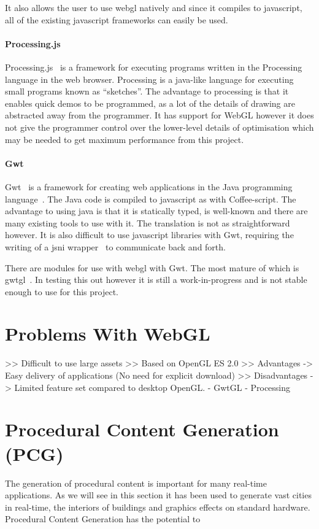 It also allows the user to use webgl natively and since it compiles to javascript, all of the existing javascript frameworks can easily be used.

\paragraph{Processing.js}
Processing.js~\cite{web:processingjs} is a framework for executing programs written in the Processing~\cite{web:processing} language in the web browser.
Processing is a java-like language for executing small programs known as ``sketches''.
The advantage to processing is that it enables quick demos to be programmed, as a lot of the details of drawing are abstracted away from the programmer.
It has support for WebGL however it does not give the programmer control over the lower-level details of optimisation which may be needed to get maximum performance from this project.

\paragraph{Gwt}
Gwt~\cite{web:gwt} is a framework for creating web applications in the Java programming language~\cite{web:java}.
The Java code is compiled to javascript as with Coffee-script.
The advantage to using java is that it is statically typed, is well-known and there are many existing tools to use with it.
The translation is not as straightforward however.
It is also difficult to use javascript libraries with Gwt, requiring the writing of a jsni wrapper~\cite{web:jsni} to communicate back and forth.

There are modules for use with webgl with Gwt.
The most mature of which is gwtgl~\cite{web:gwtgl}.
In testing this out however it is still a work-in-progress and is not stable enough to use for this project.


\section{Problems With WebGL}
    >> Difficult to use large assets
    >> Based on OpenGL ES 2.0
    >> Advantages
        -> Easy delivery of applications (No need for explicit download)
    >> Disadvantages
        -> Limited feature set compared to desktop OpenGL.
  - GwtGL
  - Processing


\section{Procedural Content Generation (PCG)}
The generation of procedural content is important for many real-time applications. 
As we will see in this section it has been used to generate vast cities in real-time, the interiors of buildings and graphics effects on standard hardware.
Procedural Content Generation has the potential to 

